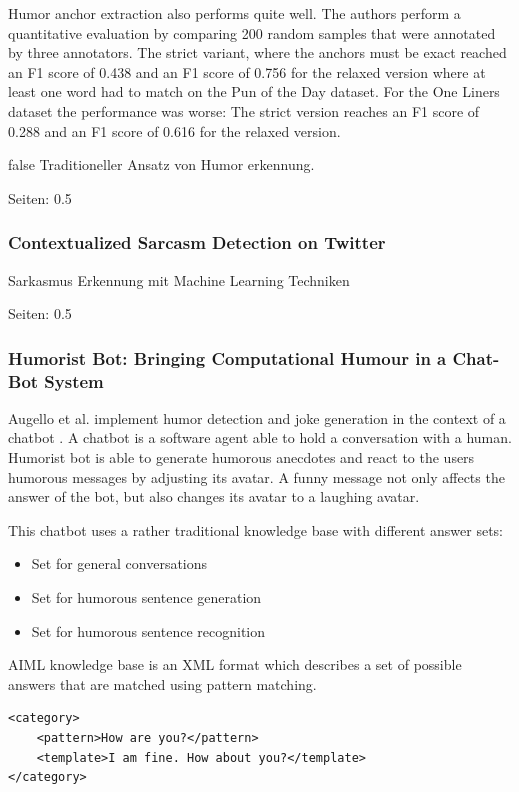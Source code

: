 \documentclass[draft,final,oneside]{vutinfth} %
\begin{document}
Humor anchor extraction also performs quite well. The authors perform a quantitative evaluation by comparing 200 random samples that were annotated by three annotators. The strict variant, where the anchors must be exact reached an F1 score of 0.438 and an F1 score of 0.756 for the relaxed version where at least one word had to match on the Pun of the Day dataset. For the One Liners dataset the performance was worse: The strict version reaches an F1 score of 0.288 and an F1 score of 0.616 for the relaxed version.

\if false
Traditioneller Ansatz von Humor erkennung.

\cite{Yang2015HumorRA}

Seiten: 0.5


\subsubsection{Contextualized Sarcasm Detection on Twitter}
Sarkasmus Erkennung mit Machine Learning Techniken

\cite{Bamman2015ContextualizedSD}

Seiten: 0.5
\fi

\subsubsection{Humorist Bot: Bringing Computational Humour in a Chat-Bot System}

Augello et al. implement humor detection and joke generation in the context of a chatbot \cite{HumoristBot}. A chatbot is a software agent able to hold a conversation with a human. Humorist bot is able to generate humorous anecdotes and react to the users humorous messages by adjusting its avatar. A funny message not only affects the answer of the bot, but also changes its avatar to a laughing avatar.

This chatbot uses a rather traditional knowledge base with different answer sets:
\begin{itemize}
\item Set for general conversations
\item Set for humorous sentence generation
\item Set for humorous sentence recognition
\end{itemize}

AIML knowledge base is an XML format which describes a set of possible answers that are matched using pattern matching.

\lstset{language=XML}
\begin{lstlisting}
<category>
    <pattern>How are you?</pattern>
    <template>I am fine. How about you?</template>
</category>
\end{lstlisting}
\end{document}
